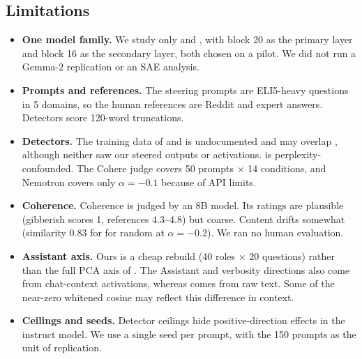 \subsection{Limitations}
\label{sec:limitations}
\begin{itemize}[leftmargin=*,itemsep=0pt,topsep=0pt]
    \item {\bf One model family.} We study only \qwen and \qwenbase, with block 20 as the primary layer and block 16 as the secondary layer, both chosen on a pilot. We did not run a Gemma-2 replication or an SAE analysis.
    \item {\bf Prompts and references.} The steering prompts are ELI5-heavy \hcthree questions in 5 domains, so the human references are Reddit and expert answers. Detectors score 120-word truncations.
    \item {\bf Detectors.} The training data of \desklib and \fakespot is undocumented and may overlap \hcthree, although neither saw our steered outputs or activations. \binoculars is perplexity-confounded. The Cohere judge covers 50 prompts $\times$ 14 conditions, and Nemotron covers only $\alpha=-0.1$ because of API limits.
    \item {\bf Coherence.} Coherence is judged by an 8B model. Its ratings are plausible (gibberish scores 1, references 4.3--4.8) but coarse. Content drifts somewhat (similarity 0.83 for \dai {} for random at $\alpha=-0.2$). We ran no human evaluation.
    \item {\bf Assistant axis.} Ours is a cheap rebuild (40 roles $\times$ 20 questions) rather than the full PCA axis of \citet{lu2026assistant}. The Assistant and verbosity directions also come from chat-context activations, whereas \dai comes from raw text. Some of the near-zero whitened cosine may reflect this difference in context.
    \item {\bf Ceilings and seeds.} Detector ceilings hide positive-direction effects in the instruct model. We use a single seed per prompt, with the 150 prompts as the unit of replication.
\end{itemize}
